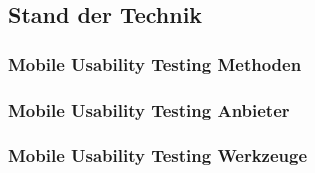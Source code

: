 \subsection{Stand der Technik}

\subsubsection{Mobile Usability Testing Methoden}

\subsubsection{Mobile Usability Testing Anbieter}

\subsubsection{Mobile Usability Testing Werkzeuge}
